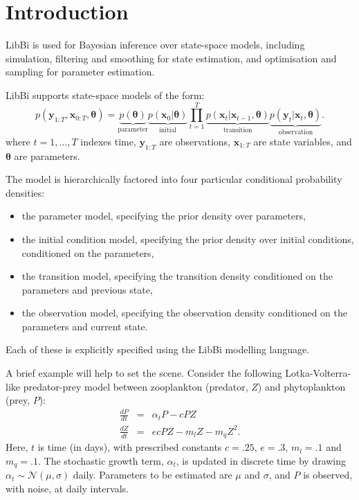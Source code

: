 \section{Introduction\label{Introduction}}

LibBi is used for Bayesian inference over state-space models, including
simulation, filtering and smoothing for state estimation, and optimisation and
sampling for parameter estimation.

LibBi supports state-space models of the form:
\begin{equation*}
p(\mathbf{y}_{1:T},\mathbf{x}_{0:T},\boldsymbol{\theta}) =
\underbrace{p(\boldsymbol{\theta})}_{\text{parameter}}
\underbrace{p(\mathbf{x}_0|\boldsymbol{\theta})}_{\text{initial}}
\prod_{t=1}^T
\underbrace{p(\mathbf{x}_t|\mathbf{x}_{t-1},\boldsymbol{\theta})}_{\text{transition}}
\underbrace{p(\mathbf{y}_t|\mathbf{x}_t,\boldsymbol{\theta})}_{\text{observation}}.
\end{equation*}
where $t = 1,\ldots,T$ indexes time, $\mathbf{y}_{1:T}$ are observations,
$\mathbf{x}_{1:T}$ are state variables, and $\boldsymbol{\theta}$ are
parameters.

The model is hierarchically factored into four particular conditional
probability densities:
\begin{itemize}
\item the parameter model, specifying the prior density over parameters,
\item the initial condition model, specifying the prior density over initial
  conditions, conditioned on the parameters,
\item the transition model, specifying the transition density conditioned on
  the parameters and previous state,
\item the observation model, specifying the observation density conditioned on
  the parameters and current state.
\end{itemize}
Each of these is explicitly specified using the LibBi modelling
language.

A brief example will help to set the scene. Consider the following
Lotka-Volterra-like predator-prey
model between zooplankton (predator, $Z$) and phytoplankton (prey, $P$):
\begin{eqnarray*}
\frac{dP}{dt} &=& \alpha_t P - cPZ\\
\frac{dZ}{dt} &=& ecPZ - m_lZ - m_q Z^2.
\end{eqnarray*}
Here, $t$ is time (in days), with prescribed constants $c = .25$, $e = .3$,
$m_l = .1$ and $m_q = .1$. The stochastic growth term, $\alpha_t$, is updated
in discrete time by drawing $\alpha_t \sim \mathcal{N}(\mu,\sigma)$
daily. Parameters to be estimated are $\mu$ and $\sigma$, and $P$ is observed,
with noise, at daily intervals.

